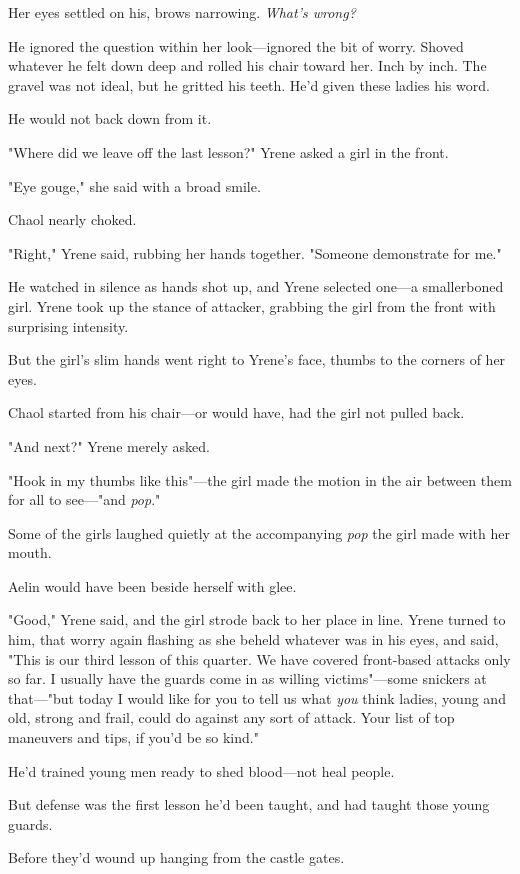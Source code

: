 Her eyes settled on his, brows narrowing.
\emph{What's wrong?}

He ignored the question within her look---ignored the bit of worry.
Shoved whatever he felt down deep and rolled his chair toward her.
Inch by inch.
The gravel was not ideal, but he gritted his teeth.
He'd given these ladies his word.

He would not back down from it.

"Where did we leave off the last lesson?"
Yrene asked a girl in the front.

"Eye gouge," she said with a broad smile.

Chaol nearly choked.

"Right," Yrene said, rubbing her hands together.
"Someone demonstrate for me."

He watched in silence as hands shot up, and Yrene selected one---a smallerboned girl.
Yrene took up the stance of attacker, grabbing the girl from the front with surprising intensity.

But the girl's slim hands went right to Yrene's face, thumbs to the corners of her eyes.

Chaol started from his chair---or would have, had the girl not pulled back.

"And next?"
Yrene merely asked.

"Hook in my thumbs like this"---the girl made the motion in the air between them for all to see---"and \emph{pop}."

Some of the girls laughed quietly at the accompanying \emph{pop} the girl made with her mouth.

Aelin would have been beside herself with glee.

"Good," Yrene said, and the girl strode back to her place in line.
Yrene turned to him, that worry again flashing as she beheld whatever was in his eyes, and said, "This is our third lesson of this quarter.
We have covered front-based attacks only so far.
I usually have the guards come in as willing victims"---some snickers at that---"but today I would like for you to tell us what \emph{you} think ladies, young and old, strong and frail, could do against any sort of attack.
Your list of top maneuvers and tips, if you'd be so kind."

He'd trained young men ready to shed blood---not heal people.

But defense was the first lesson he'd been taught, and had taught those young guards.

Before they'd wound up hanging from the castle gates.

